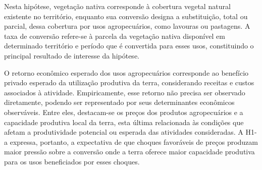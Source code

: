 {%
%
%
%
%
%
%
%
%
%
%

\medskip

Nesta hipótese, vegetação nativa corresponde à cobertura vegetal natural existente no território, enquanto sua conversão designa a substituição, total ou parcial, dessa cobertura por usos agropecuários, como lavouras ou pastagens. A taxa de conversão refere-se à parcela da vegetação nativa disponível em determinado território e período que é convertida para esses usos, constituindo o principal resultado de interesse da hipótese.

O retorno econômico esperado dos usos agropecuários corresponde ao benefício privado esperado da utilização produtiva da terra, considerando receitas e custos associados à atividade. Empiricamente, esse retorno não precisa ser observado diretamente, podendo ser representado por seus determinantes econômicos observáveis. Entre eles, destacam-se os preços dos produtos agropecuários e a capacidade produtiva local da terra, esta última relacionada às condições que afetam a produtividade potencial ou esperada das atividades consideradas. A H1-a expressa, portanto, a expectativa de que choques favoráveis de preços produzam maior pressão sobre a conversão onde a terra oferece maior capacidade produtiva para os usos beneficiados por esses choques.

}
